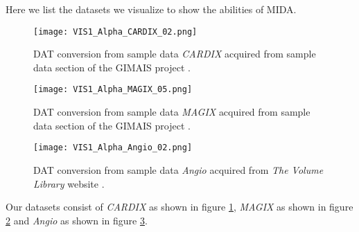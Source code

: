 Here we list the datasets we visualize to show the abilities of MIDA. 

\begin{figure}[h]
	\centering
	\texttt{[image: VIS1\_Alpha\_CARDIX\_02.png]} \\
	\caption{DAT conversion from sample data \emph{CARDIX} \cite{gimias_sampledata_2018} acquired from sample data section of the GIMAIS project \cite{gimias_2018}.}
	\label{fig:Vis1_Alpha_CARDIX_02}
\end{figure}

\begin{figure}[h]
	\centering
	\texttt{[image: VIS1\_Alpha\_MAGIX\_05.png]} \\
	\caption{DAT conversion from sample data \emph{MAGIX} \cite{gimias_sampledata_2018} acquired from sample data section of the GIMAIS project \cite{gimias_2018}.}
	\label{fig:Vis1_Alpha_MAGIX_05}
\end{figure}


\begin{figure}[h]
	\centering
	\texttt{[image: VIS1\_Alpha\_Angio\_02.png]} \\
	\caption{DAT conversion from sample data \emph{Angio} \cite{roettger_VOL_2018} acquired from \emph{The Volume Library} website \cite{roettger_VOL_2018}.}
	\label{fig:Vis1_Alpha_Angio_02}
\end{figure}

Our datasets consist of \emph{CARDIX} as shown in figure \ref{fig:Vis1_Alpha_CARDIX_02}, \emph{MAGIX} as shown in figure \ref{fig:Vis1_Alpha_MAGIX_05} and \emph{Angio} as shown in figure \ref{fig:Vis1_Alpha_Angio_02}.


